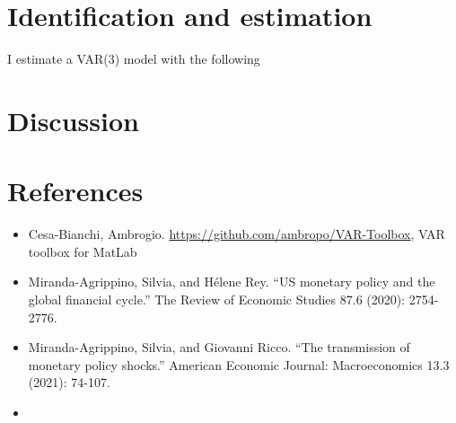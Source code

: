 \documentclass[11pt,a4paper,draft]{article}
\begin{document}
\section{Identification and estimation}
I estimate a VAR(3) model with the following 

% 

\section{Discussion}


    




\section*{References}
\begin{itemize}
    \item Cesa-Bianchi, Ambrogio. \url{https://github.com/ambropo/VAR-Toolbox}, VAR toolbox for MatLab
    \item Miranda-Agrippino, Silvia, and Hélene Rey. \enquote{US monetary policy and the global financial cycle.} The Review of Economic Studies 87.6 (2020): 2754-2776.
    \item Miranda-Agrippino, Silvia, and Giovanni Ricco. \enquote{The transmission of monetary policy shocks.} American Economic Journal: Macroeconomics 13.3 (2021): 74-107.
    \item %

\end{itemize}
\end{document}

